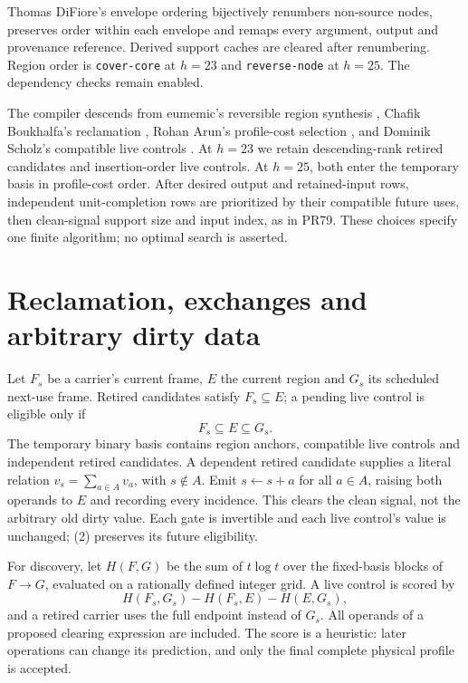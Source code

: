 \documentclass[11pt]{article}
\begin{document}
Thomas DiFiore's envelope ordering \cite{pr74} bijectively renumbers
non-source nodes, preserves order within each envelope and remaps every
argument, output and provenance reference. Derived support caches are cleared
after renumbering. Region order is \texttt{cover-core} at \(h=23\) and
\texttt{reverse-node} at \(h=25\). The dependency checks remain enabled.

The compiler descends from eumemic's reversible region synthesis
\cite{pr57}, Chafik Boukhalfa's reclamation \cite{pr60}, Rohan Arun's
profile-cost selection \cite{pr67}, and Dominik Scholz's compatible live
controls \cite{pr68}. At \(h=23\) we retain descending-rank retired candidates
and insertion-order live controls. At \(h=25\), both enter the temporary
basis in profile-cost order. After desired output and retained-input rows,
independent unit-completion rows are prioritized by their compatible future
uses, then clean-signal support size and input index, as in PR79.
These choices specify one finite algorithm; no optimal search is asserted.

\section{Reclamation, exchanges and arbitrary dirty data}
Let \(F_s\) be a carrier's current frame, \(E\) the current region and
\(G_s\) its scheduled next-use frame. Retired candidates satisfy
\(F_s\subseteq E\); a pending live control is eligible only if
\[
 F_s\subseteq E\subseteq G_s.                         \tag{2}
\]
The temporary binary basis contains region anchors, compatible live controls
and independent retired candidates. A dependent retired candidate supplies
a literal relation \(v_s=\sum_{a\in A}v_a\), with \(s\notin A\).
Emit \(s\leftarrow s+a\) for all \(a\in A\), raising both operands to
\(E\) and recording every incidence. This clears the clean signal, not the
arbitrary old dirty value. Each gate is invertible and each live control's
value is unchanged; (2) preserves its future eligibility.

For discovery, let \(H(F,G)\) be the sum of \(t\log t\) over the
fixed-basis blocks of \(F\to G\), evaluated on a rationally defined integer
grid. A live control is scored by
\[
 H(F_s,G_s)-H(F_s,E)-H(E,G_s),                         \tag{3}
\]
and a retired carrier uses the full endpoint instead of \(G_s\). All
operands of a proposed clearing expression are included. The score is a
heuristic: later operations can change its prediction, and only the final
complete physical profile is accepted.
\end{document}
